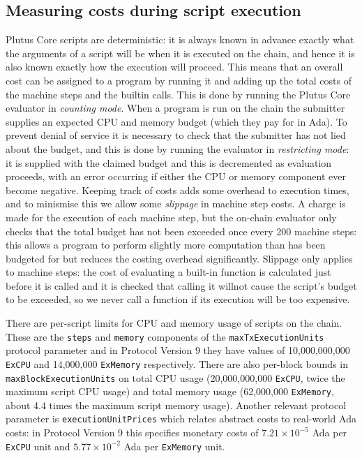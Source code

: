 \documentclass[a4paper]{article}
\begin{document}
\subsection{Measuring costs during script execution}  Plutus Core scripts
are deterministic: it is always known in advance exactly what the arguments of a
script will be when it is executed on the chain, and hence it is also known
exactly how the execution will proceed.  This means that an overall cost can be
assigned to a program by running it and adding up the total costs of the machine
steps and the builtin calls.  This is done by running the Plutus Core evaluator
in \textit{counting mode}.  When a program is run on the chain the submitter
supplies an expected CPU and memory budget (which they pay for in Ada).  To
prevent denial of service it is necessary to check that the submitter has not
lied about the budget, and this is done by running the evaluator in
\textit{restricting mode}: it is supplied with the claimed budget and this is
decremented as evaluation proceeds, with an error occurring if either the CPU or
memory component ever become negative.  Keeping track of costs adds some
overhead to execution times, and to minismise this we allow some
\textit{slippage} in machine step costs.  A charge is made for the execution of
each machine step, but the on-chain evaluator only checks that the total budget
has not been exceeded once every 200 machine steps: this allows a program to
perform slightly more computation than has been budgeted for but reduces the
costing overhead significantly.  Slippage only applies to machine steps: the
cost of evaluating a built-in function is calculated just before it is called
and it is checked that calling it willnot cause the script's budget to be
exceeded, so we never call a function if its execution will be too expensive.


There are per-script limits for CPU and memory usage of scripts on the chain.
These are the \texttt{steps} and \texttt{memory} components of the
\texttt{maxTxExecution\-Units} protocol parameter and in Protocol Version 9 they
have values of 10,000,000,000 \texttt{ExCPU} and 14,000,000 \texttt{ExMemory}
respectively.  There are also per-block bounds in
\texttt{maxBlock\-Exe\-cutionUnits} on total CPU usage (20,000,000,000
\texttt{ExCPU}, twice the maximum script CPU usage) and total memory usage
(62,000,000 \texttt{ExMemory}, about 4.4 times the maximum script memory usage).
Another relevant protocol parameter is \texttt{executionUnitPrices} which
relates abstract costs to real-world Ada costs: in Protocol Version 9 this
specifies monetary costs of $7.21\times10^{-5}$ Ada per \texttt{ExCPU} unit and
$5.77\times10^{-2}$ Ada per \texttt{ExMemory} unit.
\end{document}
